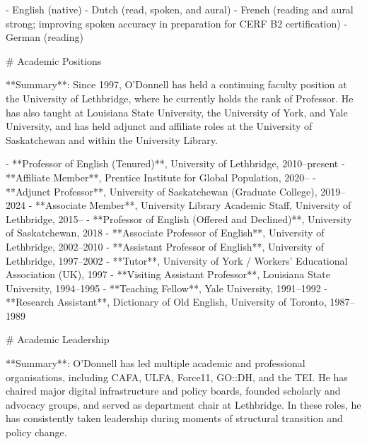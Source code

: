 - English (native)
- Dutch (read, spoken, and aural)
- French (reading and aural strong; improving spoken accuracy in preparation for CERF B2 certification)
- German (reading)

\sectionbreak{}
# Academic Positions

**Summary**: Since 1997, O'Donnell has held a continuing faculty position at the University of Lethbridge, where he currently holds the rank of Professor. He has also taught at Louisiana State University, the University of York, and Yale University, and has held adjunct and affiliate roles at the University of Saskatchewan and within the University Library.

- **Professor of English (Tenured)**, University of Lethbridge, 2010–present
- **Affiliate Member**, Prentice Institute for Global Population, 2020–
- **Adjunct Professor**, University of Saskatchewan (Graduate College), 2019–2024
- **Associate Member**, University Library Academic Staff, University of Lethbridge, 2015–
- **Professor of English (Offered and Declined)**, University of Saskatchewan, 2018
- **Associate Professor of English**, University of Lethbridge, 2002–2010
- **Assistant Professor of English**, University of Lethbridge, 1997–2002
- **Tutor**, University of York /\allowbreak{} Workers’ Educational Association (UK), 1997
- **Visiting Assistant Professor**, Louisiana State University, 1994–1995
- **Teaching Fellow**, Yale University, 1991–1992
- **Research Assistant**, Dictionary of Old English, University of Toronto, 1987–1989

\sectionbreak{}
# Academic Leadership

**Summary**: O'Donnell has led multiple academic and professional organisations, including CAFA, ULFA, Force11, GO::DH, and the TEI. He has chaired major digital infrastructure and policy boards, founded scholarly and advocacy groups, and served as department chair at Lethbridge. In these roles, he has consistently taken leadership during moments of structural transition and policy change.

